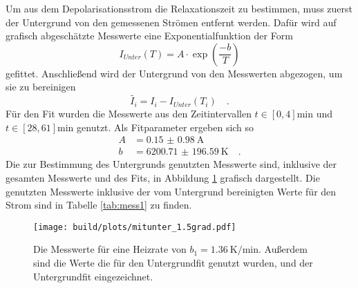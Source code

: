 \noindent
Um aus dem Depolarisationsstrom die Relaxationszeit zu bestimmen, muss zuerst der Untergrund von den gemessenen Strömen entfernt werden.
Dafür wird auf grafisch abgeschätzte Messwerte eine Exponentialfunktion der Form
\begin{equation}
  I_{Unter}(T) = A\cdot \exp\left(\frac{-b}{T}\right)
  \label{eqn:exp}
\end{equation}
gefittet. Anschließend wird der Untergrund von den Messwerten abgezogen, um sie zu bereinigen
\begin{equation*}
  \tilde{I_i} = I_i - I_{Unter}(T_i) \quad.
\end{equation*}
Für den Fit wurden die Messwerte aus den Zeitintervallen $t \in [0,4]\si{\minute}$ und $t \in [28,61]\si{\minute}$ genutzt.
Als Fitparameter ergeben sich so 
\begin{align*}
  A &= \SI{0.15(098)}{\ampere}\\
  b &= \SI{6200.71(19659)}{\kelvin} \quad .
\end{align*}
Die zur Bestimmung des Untergrunds genutzten Messwerte sind,
inklusive der gesamten Messwerte und des Fits, in Abbildung \ref{img:mitunter15} grafisch dargestellt. 
Die genutzten Messwerte inklusive der vom Untergrund bereinigten Werte für den Strom sind in Tabelle \ref{tab:mess1} zu finden.
\begin{figure}[h]
  \centering
  \texttt{[image: build/plots/mitunter\_1.5grad.pdf]}
  \caption{Die Messwerte für eine Heizrate von $b_1 = \SI{1.36}{\kelvin\per\minute}$. 
  Außerdem sind die Werte die für den Untergrundfit genutzt wurden, und der Untergrundfit eingezeichnet.}
  \label{img:mitunter15}
\end{figure}

